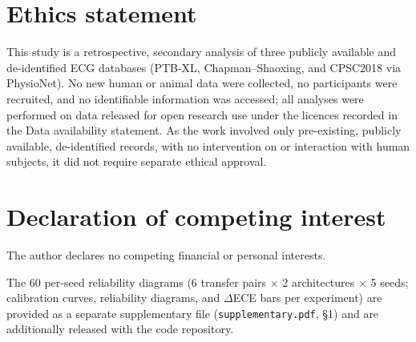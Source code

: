 \documentclass[review,12pt,nonatbib]{elsarticle}
\begin{document}
\section*{Ethics statement}
This study is a retrospective, secondary analysis of three publicly
available and de-identified ECG databases (PTB-XL, Chapman--Shaoxing,
and CPSC2018 via PhysioNet). No new human or animal data were collected,
no participants were recruited, and no identifiable information was
accessed; all analyses were performed on data released for open research
use under the licences recorded in the Data availability statement. As
the work involved only pre-existing, publicly available, de-identified
records, with no intervention on or interaction with human subjects, it
did not require separate ethical approval.

\section*{Declaration of competing interest}
The author declares no competing financial or personal interests.

The 60 per-seed reliability diagrams
(6 transfer pairs $\times$ 2 architectures $\times$ 5 seeds; calibration
curves, reliability diagrams, and $\Delta$ECE bars per experiment) are
provided as a separate supplementary file
(\texttt{supplementary.pdf}, \S1) and are additionally released with
the code repository.
\end{document}
